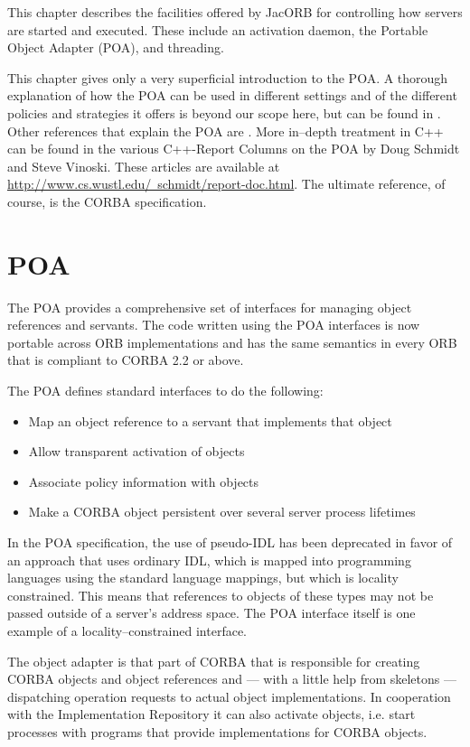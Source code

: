 
This  chapter   describes  the   facilities  offered  by   JacORB  for
controlling  how servers are  started and  executed. These  include an
activation daemon, the Portable Object Adapter (POA), and threading.

This chapter gives only a very superficial introduction to the POA.  A
thorough explanation of how the POA can be used in different settings and of
the different policies and strategies it offers is beyond our scope here, but
can be found in \cite{Brose2001a}.  Other references that explain the POA are
\cite{Henning1999, Vinoski1998}.  More in--depth treatment in C++ can be found
in the various C++-Report Columns on the POA by Doug Schmidt and Steve
Vinoski.  These articles are available at
\href{http://www.cs.wustl.edu/~schmidt/report-doc.html}{http://www.cs.wustl.edu/~schmidt/report-doc.html}.
The ultimate reference, of course, is the CORBA specification.

\section{POA}

The POA provides a comprehensive set of interfaces for managing object
references and servants. The code  written using the POA interfaces is
now portable across ORB implementations  and has the same semantics in
every ORB that is compliant to CORBA 2.2 or above.

The POA defines standard interfaces to do the following:
\begin{itemize}
\item Map an object reference to a servant that implements that object
\item Allow transparent activation of objects
\item Associate policy information with objects
\item  Make a  CORBA  object persistent  over  several server  process
lifetimes
\end{itemize}

In the POA specification, the use of pseudo-IDL has been deprecated in
favor  of an approach  that uses  ordinary IDL,  which is  mapped into
programming languages using the  standard language mappings, but which
is  locality constrained.  This means  that references  to  objects of
these types may not be passed outside of a server's address space. The
POA  interface  itself  is  one  example of  a  locality--constrained
interface.

The  object adapter  is that  part of  CORBA that  is  responsible for
creating CORBA  objects and  object references and  --- with  a little
help  from  skeletons ---  dispatching  operation  requests to  actual
object  implementations.   In  cooperation  with   the  Implementation
Repository  it can also  activate objects,  i.e. start  processes with
programs that provide implementations for CORBA objects.

